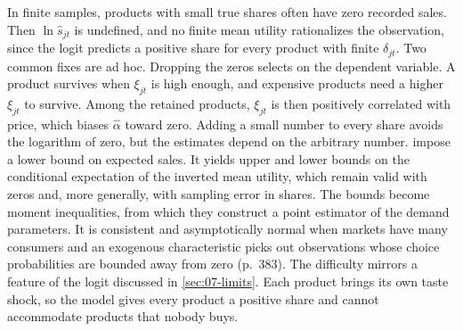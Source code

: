 In finite samples, products with small true shares often have zero recorded sales. Then $\ln\hat s_{jt}$ is
undefined, and no finite mean utility rationalizes the observation, since the logit predicts a positive share
for every product with finite $\delta_{jt}$. Two common fixes are ad hoc. Dropping the zeros selects on the
dependent variable. A product survives when $\xi_{jt}$ is high enough, and expensive products need a higher
$\xi_{jt}$ to survive. Among the retained products, $\xi_{jt}$ is then positively correlated with price, which
biases $\hat\alpha$ toward zero. Adding a small number to every share avoids the logarithm of zero, but the
estimates depend on the arbitrary number. \citet[pp.~381--383]{GandhiLuShi2023} impose a lower bound on
expected sales. It yields upper and lower bounds on the conditional expectation of the inverted mean utility,
which remain valid with zeros and, more generally, with sampling error in shares. The bounds become moment
inequalities, from which they construct a point estimator of the demand parameters. It is consistent and
asymptotically normal when markets have many consumers and an exogenous characteristic picks out observations whose
choice probabilities are bounded away from zero (p.~383).
The difficulty mirrors a feature of the logit discussed in \cref{sec:07-limits}. Each product brings its own taste
shock, so the model gives every product a positive share and cannot accommodate products that nobody buys.
